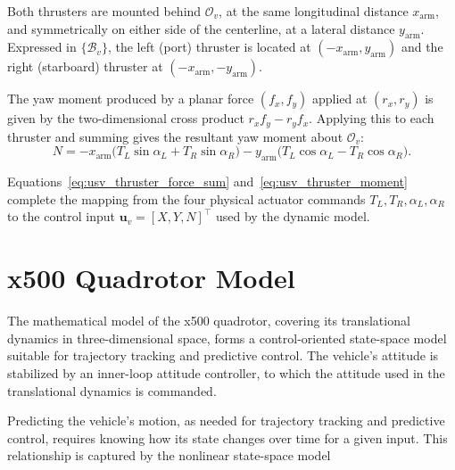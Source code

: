 Both thrusters are mounted behind $\mathcal{O}_v$, at the same longitudinal distance $x_{\mathrm{arm}}$, and symmetrically on either side of the centerline, at a lateral distance $y_{\mathrm{arm}}$. Expressed in $\{\mathcal{B}_v\}$, the left (port) thruster is located at $(-x_{\mathrm{arm}}, y_{\mathrm{arm}})$ and the right (starboard) thruster at $(-x_{\mathrm{arm}}, -y_{\mathrm{arm}})$. 

The yaw moment produced by a planar force $(f_x, f_y)$ applied at $(r_x, r_y)$ is given by the two-dimensional cross product $r_x f_y - r_y f_x$. Applying this to each thruster and summing gives the resultant yaw moment about $\mathcal{O}_v$:
\begin{equation}
    N = -x_{\mathrm{arm}}\big(T_L\sin\alpha_L + T_R\sin\alpha_R\big) - y_{\mathrm{arm}}\big(T_L\cos\alpha_L - T_R\cos\alpha_R\big).
    \label{eq:usv_thruster_moment}
\end{equation}

Equations~\eqref{eq:usv_thruster_force_sum} and~\eqref{eq:usv_thruster_moment} complete the mapping from the four physical actuator commands $T_L, T_R, \alpha_L, \alpha_R$ to the control input $\mathbf{u}_v = [X, Y, N]^\top$ used by the dynamic model.


\section{x500 Quadrotor Model}
\label{sec:mod_uav}

The mathematical model of the x500 quadrotor, covering its translational dynamics in three-dimensional space, forms a control-oriented state-space model suitable for trajectory tracking and predictive control.
The vehicle's attitude is stabilized by an inner-loop attitude controller, to which the attitude used in the translational dynamics is commanded.

Predicting the vehicle's motion, as needed for trajectory tracking and predictive control, requires knowing how its state changes over time for a given input. This relationship is captured by the nonlinear state-space model

